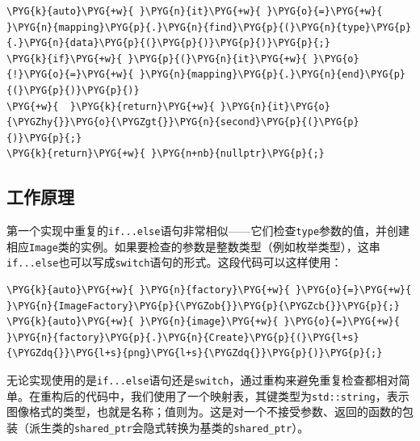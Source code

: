 \begin{codeblockbg}
\begin{Verbatim}[commandchars=\\\{\},breaklines=true,breakanywhere=true,fontsize=\codefont,xleftmargin=17bp]
\PYG{k}{auto}\PYG{+w}{ }\PYG{n}{it}\PYG{+w}{ }\PYG{o}{=}\PYG{+w}{ }\PYG{n}{mapping}\PYG{p}{.}\PYG{n}{find}\PYG{p}{(}\PYG{n}{type}\PYG{p}{.}\PYG{n}{data}\PYG{p}{(}\PYG{p}{)}\PYG{p}{)}\PYG{p}{;}
\PYG{k}{if}\PYG{+w}{ }\PYG{p}{(}\PYG{n}{it}\PYG{+w}{ }\PYG{o}{!}\PYG{o}{=}\PYG{+w}{ }\PYG{n}{mapping}\PYG{p}{.}\PYG{n}{end}\PYG{p}{(}\PYG{p}{)}\PYG{p}{)}
\PYG{+w}{  }\PYG{k}{return}\PYG{+w}{ }\PYG{n}{it}\PYG{o}{\PYGZhy{}}\PYG{o}{\PYGZgt{}}\PYG{n}{second}\PYG{p}{(}\PYG{p}{)}\PYG{p}{;}
\PYG{k}{return}\PYG{+w}{ }\PYG{n+nb}{nullptr}\PYG{p}{;}
\end{Verbatim}
\end{codeblockbg}



\subsection{工作原理}



第一个实现中重复的\texttt{if...\allowbreak{}else}语句非常相似——它们检查\texttt{type}参数的值，并创建相应\texttt{Image}类的实例。如果要检查的参数是整数类型（例如枚举类型），这串\texttt{if...\allowbreak{}else}也可以写成\texttt{switch}语句的形式。这段代码可以这样使用：



\begin{codeblockbg}
\begin{Verbatim}[commandchars=\\\{\},breaklines=true,breakanywhere=true,fontsize=\codefont,xleftmargin=17bp]
\PYG{k}{auto}\PYG{+w}{ }\PYG{n}{factory}\PYG{+w}{ }\PYG{o}{=}\PYG{+w}{ }\PYG{n}{ImageFactory}\PYG{p}{\PYGZob{}}\PYG{p}{\PYGZcb{}}\PYG{p}{;}
\PYG{k}{auto}\PYG{+w}{ }\PYG{n}{image}\PYG{+w}{ }\PYG{o}{=}\PYG{+w}{ }\PYG{n}{factory}\PYG{p}{.}\PYG{n}{Create}\PYG{p}{(}\PYG{l+s}{\PYGZdq{}}\PYG{l+s}{png}\PYG{l+s}{\PYGZdq{}}\PYG{p}{)}\PYG{p}{;}
\end{Verbatim}
\end{codeblockbg}



无论实现使用的是\texttt{if...\allowbreak{}else}语句还是\texttt{switch}，通过重构来避免重复检查都相对简单。在重构后的代码中，我们使用了一个映射表，其键类型为\texttt{std::\allowbreak{}string}，表示图像格式的类型，也就是名称；值则为。这是对一个不接受参数、返回的函数的包装（派生类的\texttt{shared\_\allowbreak{}ptr}会隐式转换为基类的\texttt{shared\_\allowbreak{}ptr}）。


